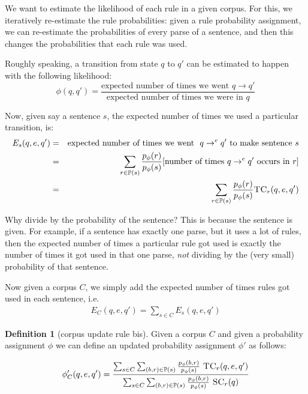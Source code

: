\documentclass[12pt]{article}
\theoremstyle{definition}
\newtheorem{definition}{Definition}[section]
\begin{document}
We want to estimate the likelihood of each rule in a given corpus. For this, we iteratively re-estimate the rule probabilities: given a rule probability assignment, we can re-estimate the probabilities of every parse of a sentence, and then this changes the probabilities that each rule was used.

Roughly speaking, a transition from state $q$ to $q'$ can be estimated to happen with the following likelihood:
$$\phi(q,q') = \frac{\textrm{expected number of times we went }q\rightarrow q'}{\textrm{expected number of times we were in }q}$$

Now, given say a sentence $s$, the expected number of times we used a particular transition, is:
\begin{eqnarray*}
  E_s(q,e,q') & = & \textrm{expected number of times we went }~q\rightarrow^eq'~\textrm{to make sentence}~s \\
  & = & \sum_{r\in\mathbb{P}(s)}\frac{p_\phi(r)}{p_\phi(s)}[\textrm{number of times}~q\rightarrow^eq'\textrm{ occurs in }r ] \\
  & = & \sum_{r\in\mathbb{P}(s)}\frac{p_\phi(r)}{p_\phi(s)}\textsc{TC}_r(q,e,q')
  \end{eqnarray*}

Why divide by the probability of the sentence? This is because the sentence is given. For example, if a sentence has exactly one parse, but it uses a lot of rules, then the expected number of times a particular rule got used is exactly the number of times it got used in that one parse, \emph{not} dividing by the (very small) probability of that sentence.



Now given a corpus $C$, we simply add the expected number of times rules got used in each sentence, i.e.
\begin{eqnarray*}
  E_C(q,e,q') = \sum_{s\in C}E_s(q,e,q')
\end{eqnarray*}



\begin{definition}[corpus update rule bis]
  Given a corpus $C$ and given a probability assignment $\phi$ we can define an updated probability assignment $\phi'$ as follows:

  $$\phi_C'(q,e,q') = \frac{\sum_{s\in C}\sum_{(b,r)\in\mathbb{P}(s)} \frac{p_\phi(b,r)}{p_\phi(s)}~ \textsc{TC}_r(q,e,q')}{\sum_{s\in C}\sum_{(b,r)\in\mathbb{P}(s)} \frac{p_\phi(b,r)}{p_\phi(s)}~ \textsc{SC}_r(q)}$$ 

\end{definition}
\end{document}
